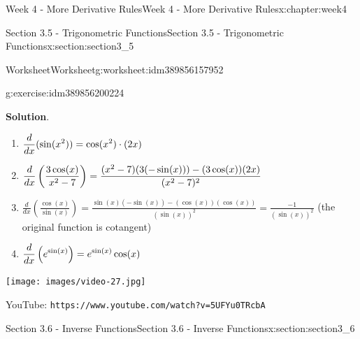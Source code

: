 \documentclass[oneside,10pt,]{book}
\newcommand{\blocktitlefont}{\relax}
\newcommand{\mono}[1]{\texttt{#1}}
\numberwithin{equation}{section}
\newlength{\qrsize}
\newlength{\previewwidth}
\begin{document}
\begin{chapterptx}{Week 4 - More Derivative Rules}{}{Week 4 - More Derivative Rules}{}{}{x:chapter:week4}
\begin{sectionptx}{Section 3.5 - Trigonometric Functions}{}{Section 3.5 - Trigonometric Functions}{}{}{x:section:section3_5}
\begin{worksheet-subsection}{Worksheet}{}{Worksheet}{}{}{g:worksheet:idm389856157952}
\begin{divisionexercise}{3}{}{}{g:exercise:idm389856200224}
\begin{enumerate}[label=(\alph*)]
\end{enumerate}
\textbf{\blocktitlefont Solution}.\hypertarget{g:solution:idm389856209152}{}\quad{}%
\begin{enumerate}[label=(\alph*)]
\item{}\(\displaystyle \displaystyle \frac{d}{dx} (\sin(x^2))= \cos(x^2)\cdot (2x)\)%
\item{}\(\displaystyle \displaystyle\frac{d}{dx} \left( \frac{3\cos(x)}{x^2-7}\right)= \frac{(x^2-7)(3(-\sin(x)))-(3\cos(x))(2x)}{(x^2-7)^2}\)%
\item{}\(\displaystyle\frac{d}{dx} \left( \frac{\cos(x)}{\sin(x)} \right) = \frac{\sin(x)(-\sin(x))-(\cos(x))(\cos(x))}{(\sin(x))^2} = \frac{-1}{(\sin(x))^2} \) (the original function is cotangent)%
\item{}\(\displaystyle \displaystyle\frac{d}{dx} \left( e^{\sin(x)} \right) = e^{\sin(x)}\cos(x)\)%
\end{enumerate}
\end{divisionexercise}%
\end{worksheet-subsection}
\restoregeometry
\setlength{\qrsize}{9em}
\setlength{\previewwidth}{\linewidth}
\addtolength{\previewwidth}{-\qrsize}
\begin{tcbraster}[raster columns=2, raster column skip=1pt, raster halign=center, raster force size=false, raster left skip=0pt, raster right skip=0pt]%
\begin{tcolorbox}[previewstyle, width=\previewwidth]%
\texttt{[image: images/video-27.jpg]}%
\end{tcolorbox}%
\begin{tcolorbox}[qrstyle]%
{\hypersetup{urlcolor=black}}%
\end{tcolorbox}%
\begin{tcolorbox}[captionstyle]%
\small YouTube: \mono{https://www.youtube.com/watch?v=5UFYu0TRcbA}\end{tcolorbox}%
\end{tcbraster}%
\end{sectionptx}
%
%
\typeout{************************************************}
\typeout{************************************************}
%
\begin{sectionptx}{Section 3.6 - Inverse Functions}{}{Section 3.6 - Inverse Functions}{}{}{x:section:section3_6}
\setlength{\qrsize}{9em}
\setlength{\previewwidth}{\linewidth}
\addtolength{\previewwidth}{-\qrsize}
\begin{tcbraster}[raster columns=2, raster column skip=1pt, raster halign=center, raster force size=false, raster left skip=0pt, raster right skip=0pt]%

\end{tcbraster}
\end{sectionptx}
\end{chapterptx}
\end{document}
